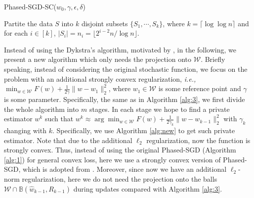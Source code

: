 \documentclass[12pt]{alt2022} %
\begin{document}
\begin{algorithm}
	\caption{Phased-SGD-SC($w_0, \gamma, \epsilon, \delta$) \label{alg:new}}
	    Partite the data $S$ into $k$ disjoint subsets $\{S_1, \cdots, S_k\}$, where $k=\lceil \log\log n\rceil$ and for each $i\in [k]$, $|S_i|=n_i=\lfloor 2^{i-2} n/\log n \rfloor$.\;
	    
\end{algorithm}
Instead of using the Dykstra’s algorithm, motivated by \citep{xu2017stochastic}, in the following, we present a new algorithm which only needs the projection onto $\mathcal{W}$. Briefly speaking, instead of considering the original stochastic function, we focus on the problem with an additional strongly convex regularization, {\em i.e.,}
   $ \min_{w\in \mathcal{W}}F(w)+\frac{1}{2\gamma}\|w-w_1\|_2^2$, 
where $w_1\in \mathcal{W}$ is some reference point and $\gamma$ is some parameter. Specifically, the same as in Algorithm \ref{alg:3}, we first divide the whole algorithm into $m$ stages. In each stage we hope to find a private estimator $w^k$ such that $w^k \approx \arg\min_{w\in \mathcal{W}}F(w)+\frac{1}{2\gamma_k}\|w-w_{k-1}\|_2^2$ with $\gamma_k$ changing with $k$. Specifically, we use Algorithm \ref{alg:new} to get such private estimator. Note that due to the additional $\ell_2$ regularization, now the function is strongly convex. Thus, instead of using the original Phased-SGD (Algorithm \ref{alg:1}) for general convex loss, here we use a strongly convex version of Phased-SGD, which is adopted from \citep{feldman2020private}. Moreover, 
since now we have an additional $\ell_2$-norm regularization, here we do not need the projection onto the balls  $\mathcal{W}\cap \mathbb{B}(\hat{w}_{k-1},R_{k-1})$ during updates compared with Algorithm \ref{alg:3}. 
\end{document}
